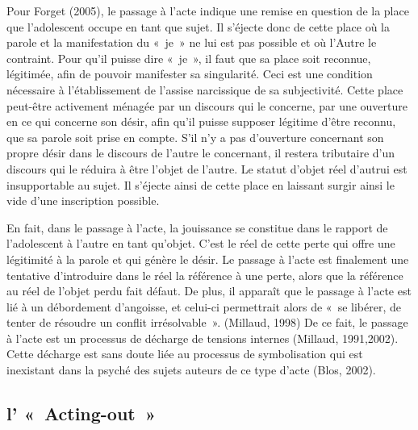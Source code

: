 \documentclass[12pt, a4paper]{book}
\begin{document}
\begin{spacing}{1.5}
Pour Forget (2005), le passage à l'acte indique une remise en question de la place que l'adolescent occupe en tant que sujet. Il s'éjecte donc de cette place où la parole et la manifestation du « je » ne lui est pas possible et où l'Autre le contraint. Pour qu'il puisse dire « je », il faut que sa place soit reconnue, légitimée, afin de pouvoir manifester sa singularité. Ceci est une condition nécessaire à l'établissement de l'assise narcissique de sa subjectivité. Cette place peut-être activement  ménagée par un discours qui le concerne, par une ouverture en ce qui concerne son désir, afin qu'il puisse supposer légitime d'être reconnu, que sa parole soit prise en compte. S'il n'y a pas d'ouverture concernant son propre désir dans le discours de l'autre le concernant, il restera tributaire d'un discours qui le réduira à être l'objet de l'autre. Le statut d'objet réel d'autrui est insupportable au sujet. Il s'éjecte ainsi de cette place en laissant surgir ainsi le vide d'une inscription possible. 

En fait, dans le passage à l'acte, la jouissance se constitue dans le rapport de l'adolescent à l'autre en tant qu'objet. C'est le réel de cette perte qui offre une légitimité à la parole et qui génère le désir. Le passage à l'acte est finalement une tentative d'introduire dans le réel la référence à une perte, alors que la référence au réel de l'objet perdu fait défaut. De plus, il apparaît que le passage à l'acte est lié à un débordement d'angoisse, et celui-ci permettrait alors de « se libérer, de tenter de résoudre un conflit irrésolvable ». (Millaud, 1998) De ce fait, le passage à l'acte est un processus de décharge de tensions internes (Millaud, 1991,2002). Cette décharge est sans doute liée au processus de symbolisation qui est inexistant dans la psyché des sujets auteurs de ce type d'acte (Blos, 2002).

\subsection{l' « Acting-out »}


\end{spacing}
\end{document}
